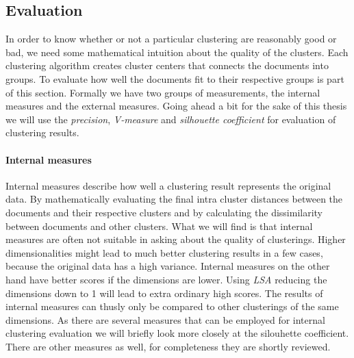   \subsection{Evaluation}
    In order to know whether or not a particular clustering are reasonably good or bad, we need some mathematical intuition about the quality of the clusters. Each clustering algorithm creates cluster centers that connects the documents into groups. To evaluate how well the documents fit to their respective groups is part of this section.
    Formally we have two groups of measurements, the internal measures and the external measures. Going ahead a bit for the sake of this thesis we will use the \emph{precision}, \emph{V-measure} and \emph{silhouette coefficient} for evaluation of clustering results.

    \paragraph{Internal measures}
      Internal measures describe how well a clustering result represents the original data. By mathematically evaluating the final intra cluster distances between the documents and their respective clusters and by calculating the dissimilarity between documents and other clusters. What we will find is that internal measures are often not suitable in asking about the quality of clusterings. Higher dimensionalities might lead to much better clustering results in a few cases, because the original data has a high variance. Internal measures on the other hand have better scores if the dimensions are lower. Using \emph{LSA} reducing the dimensions down to 1 will lead to extra ordinary high scores. The results of internal measures can thusly only be compared to other clusterings of the same dimensions. As there are several measures that can be employed for internal clustering evaluation we will briefly look more closely at the silouhette coefficient. There are other measures as well, for completeness they are shortly reviewed.

